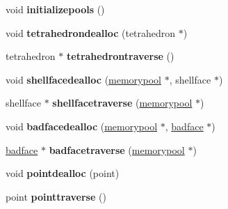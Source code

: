 \begin{DoxyCompactItemize}
\item 
\hypertarget{classtetgenmesh_a0ed29d97e57db7035017c312dc6aaa2f}{void {\bfseries initializepools} ()}\label{classtetgenmesh_a0ed29d97e57db7035017c312dc6aaa2f}

\item 
\hypertarget{classtetgenmesh_a29b3b481a2306b71f81c975481a890e1}{void {\bfseries tetrahedrondealloc} (tetrahedron $\ast$)}\label{classtetgenmesh_a29b3b481a2306b71f81c975481a890e1}

\item 
\hypertarget{classtetgenmesh_a11da430cc44475b41fdbfc80de511192}{tetrahedron $\ast$ {\bfseries tetrahedrontraverse} ()}\label{classtetgenmesh_a11da430cc44475b41fdbfc80de511192}

\item 
\hypertarget{classtetgenmesh_ab368f639981dcf465b5e8654942bcc69}{void {\bfseries shellfacedealloc} (\hyperlink{classtetgenmesh_1_1memorypool}{memorypool} $\ast$, shellface $\ast$)}\label{classtetgenmesh_ab368f639981dcf465b5e8654942bcc69}

\item 
\hypertarget{classtetgenmesh_ae50ecae1d69935b12a4fa7ca843011d7}{shellface $\ast$ {\bfseries shellfacetraverse} (\hyperlink{classtetgenmesh_1_1memorypool}{memorypool} $\ast$)}\label{classtetgenmesh_ae50ecae1d69935b12a4fa7ca843011d7}

\item 
\hypertarget{classtetgenmesh_aad53a5111de2c6a8b06664ef9553e293}{void {\bfseries badfacedealloc} (\hyperlink{classtetgenmesh_1_1memorypool}{memorypool} $\ast$, \hyperlink{structtetgenmesh_1_1badface}{badface} $\ast$)}\label{classtetgenmesh_aad53a5111de2c6a8b06664ef9553e293}

\item 
\hypertarget{classtetgenmesh_a1c643ae4bcab5caf68b58291fdb3ba29}{\hyperlink{structtetgenmesh_1_1badface}{badface} $\ast$ {\bfseries badfacetraverse} (\hyperlink{classtetgenmesh_1_1memorypool}{memorypool} $\ast$)}\label{classtetgenmesh_a1c643ae4bcab5caf68b58291fdb3ba29}

\item 
\hypertarget{classtetgenmesh_abafc92933f5d33791abeca5eb0a7cc05}{void {\bfseries pointdealloc} (point)}\label{classtetgenmesh_abafc92933f5d33791abeca5eb0a7cc05}

\item 
\hypertarget{classtetgenmesh_a2b088cf9fa743d47b4520d43d9964087}{point {\bfseries pointtraverse} ()}\label{classtetgenmesh_a2b088cf9fa743d47b4520d43d9964087}


\end{DoxyCompactItemize}
